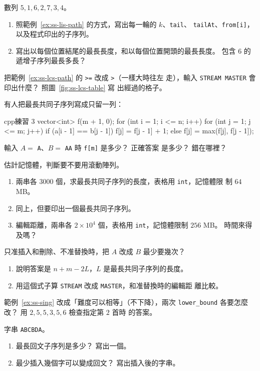 \begin{drills}[label=drills:ss]
\item 數列 $5, 1, 6, 2, 7, 3, 4$。
\begin{enumerate}
\item 照範例~\ref{ex:ss-lis-path} 的方式，寫出每一輪的 $k$、\texttt{tail}、
\texttt{tailAt}、\texttt{from[i]}，以及程式印出的子序列。
\item 寫出以每個位置結尾的最長長度，和以每個位置開頭的最長長度。 包含 $6$ 的
遞增子序列最長多長？
\end{enumerate}

\item 把範例~\ref{ex:ss-lcs-path} 的 \texttt{>=} 改成 \texttt{>}（一樣大時往左
走），輸入 \texttt{STREAM MASTER} 會印出什麼？ 照圖~\ref{fig:ss-lcs-table} 寫
出經過的格子。

\item 有人把最長共同子序列寫成只留一列：
\begin{code}{cpp}{練習 3}
vector<int> f(m + 1, 0);
for (int i = 1; i <= n; i++) {
    for (int j = 1; j <= m; j++) {
        if (a[i - 1] == b[j - 1]) {
            f[j] = f[j - 1] + 1;
        } else {
            f[j] = max(f[j], f[j - 1]);
        }
    }
}
\end{code}
輸入 $A = $ \texttt{A}、$B = $ \texttt{AA} 時 \texttt{f[m]} 是多少？ 正確答案
是多少？ 錯在哪裡？

\item 估計記憶體，判斷要不要用滾動陣列。
\begin{enumerate}
\item 兩串各 $3000$ 個，求最長共同子序列的長度，表格用 \texttt{int}，記憶體限
制 $64$ MB。
\item 同上，但要印出一個最長共同子序列。
\item 編輯距離，兩串各 $2 \times 10^4$ 個，表格用 \texttt{int}，記憶體限制
$256$ MB。 時間來得及嗎？
\end{enumerate}

\item 只准插入和刪除、不准替換時，把 $A$ 改成 $B$ 最少要幾次？
\begin{enumerate}
\item 說明答案是 $n + m - 2L$，$L$ 是最長共同子序列的長度。
\item 用這個式子算 \texttt{STREAM} 改成 \texttt{MASTER}，和准替換時的編輯距
離比較。
\end{enumerate}

\item 範例~\ref{ex:ss-sing} 改成「難度可以相等」（不下降），兩次
\texttt{lower\_bound} 各要怎麼改？ 用 $2, 5, 5, 3, 5, 6$ 檢查指定第 $2$ 首時
的答案。

\item 字串 \texttt{ABCBDA}。
\begin{enumerate}
\item 最長回文子序列是多少？ 寫出一個。
\item 最少插入幾個字可以變成回文？ 寫出插入後的字串。
\end{enumerate}
\end{drills}


